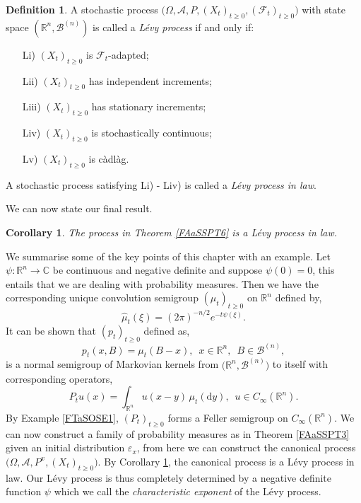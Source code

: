 \documentclass[a4paper, 12pt]{report}
\newtheorem{cor}[theorem]{Corollary}
\theoremstyle{cor}
\theoremstyle{remark}
\theoremstyle{definition}
\newtheorem{defn}[theorem]{Definition}
\begin{document}
\begin{defn}
A stochastic process $\big(\Omega, \mathcal{A}, P, (X_t)_{t \ge 0}, (\mathcal{F}_t)_{t \ge 0}\big)$ with state space $(\mathbb{R}^n, \mathcal{B}^{(n)})$ is called a \emph{L\'evy process} if and only if:
\begin{itemize}
\item[Li)] $(X_t)_{t \ge 0}$ is $\mathcal{F}_t$-adapted;

\item[Lii)] $(X_t)_{t \ge 0}$ has independent increments;

\item[Liii)] $(X_t)_{t \ge 0}$ has stationary increments;

\item[Liv)] $(X_t)_{t \ge 0}$ is stochastically continuous;

\item[Lv)] $(X_t)_{t \ge 0}$ is c\`adl\`ag.
\end{itemize}
A stochastic process satisfying Li) - Liv) is called a \emph{L\'evy process in law}.
\end{defn}

We can now state our final result.

\begin{cor}\label{FAaSSPC6}
The process in Theorem \ref{FAaSSPT6} is a L\'evy process in law.
\end{cor}

We summarise some of the key points of this chapter with an example.  Let $\psi : \mathbb{R}^n \to \mathbb{C}$ be continuous and negative definite and suppose $\psi(0) = 0$, this entails that we are dealing with probability measures.  Then we have the corresponding unique convolution semigroup $(\mu_t)_{t \ge 0}$ on $\mathbb{R}^n$ defined by,
$$
\hat{\mu}_t(\xi) = (2\pi)^{-n/2}e^{-t\psi(\xi)}.
$$
It can be shown that $(p_t)_{t \ge 0}$ defined as,
$$
p_t(x, B) = \mu_t(B - x), \,\,\, x \in \mathbb{R}^n, \,\,\, B \in \mathcal{B}^{(n)},
$$
is a normal semigroup of Markovian kernels from $\big(\mathbb{R}^n, \mathcal{B}^{(n)}\big)$ to itself with corresponding operators,
$$
P_tu(x) = \int_{\mathbb{R}^n}u(x - y)\,\mu_t(\mathrm{d}y), \,\,\, u \in C_\infty(\mathbb{R}^n).
$$
By Example \ref{FTaSOSE1}, $(P_t)_{t \ge 0}$ forms a Feller semigroup on $C_\infty(\mathbb{R}^n)$.  We can now construct a family of probability measures as in Theorem \ref{FAaSSPT3} given an initial distribution $\varepsilon_x$, from here we can construct the canonical process $\big(\Omega, \mathcal{A}, P^x, (X_t)_{t \ge 0}\big)$.  By Corollary \ref{FAaSSPC6}, the canonical process is a L\'evy process in law.  Our L\'evy process is thus completely determined by a negative definite function $\psi$ which we call the \emph{characteristic exponent} of the L\'evy process.
\end{document}
